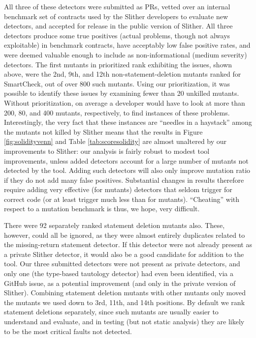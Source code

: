 All three of these detectors were submitted as PRs, vetted over an internal benchmark set of contracts used by the Slither developers to evaluate new detectors, and accepted for release in the public version of Slither.  All three detectors produce some true positives (actual problems, though not always exploitable) in benchmark contracts, have acceptably low false positive rates, and were deemed valuable enough to include as non-informational (medium severity) detectors.  The first mutants in prioritized rank exhibiting the issues, shown above, were the 2nd, 9th, and 12th non-statement-deletion mutants ranked for SmartCheck, out of over 800 such mutants.  Using our prioritization, it was possible to identify these issues by examining fewer than 20 unkilled mutants.  Without prioritization, on average a developer would have to look at more than 200, 80, and 400 mutants, respectively, to find instances of these problems.  Interestingly, the very fact that these instances are ``needles in a haystack'' among the mutants not killed by Slither means that the results in Figure \ref{fig:solidityvenn} and Table \ref{tab:scoresolidity} are almost unaltered by our improvements to Slither: our analysis is fairly robust to modest tool improvements, unless added detectors account for a large number of mutants not detected by the tool.  Adding such detectors will also only improve mutation ratio if they do not add many false positives.  Substantial changes in results therefore require adding very effective (for mutants) detectors that seldom trigger for correct code (or at least trigger much less than for mutants).  ``Cheating'' with respect to a mutation benchmark is thus, we hope, very difficult.

There were 92 separately ranked statement deletion mutants also.  These, however, could all be ignored, as they were almost entirely duplicates related to the missing-return statement detector.  If this detector were not already present as a private Slither detector, it would also be a good candidate for addition to the tool.  Our three submitted detectors were not present as private detectors, and only one (the type-based tautology detector) had even been identified, via a GitHub issue, as a potential improvement (and only in the private version of Slither).  Combining statement deletion mutants with other mutants only moved the mutants we used down to 3rd, 11th, and 14th positions.  By default we rank statement deletions separately, since such mutants are usually easier to understand and evaluate, and in testing (but not static analysis) they are likely to be the most critical faults not detected.

